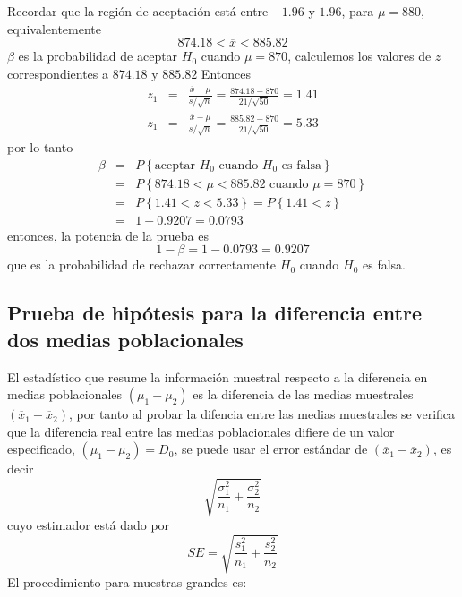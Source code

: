 \begin{Ejem}
Recordar que la regi\'on de aceptaci\'on est\'a entre $-1.96$ y $1.96$, para $\mu=880$, equivalentemente $$874.18<\overline{x}<885.82$$
$\beta$ es la probabilidad de aceptar $H_{0}$ cuando $\mu=870$, calculemos los valores de $z$ correspondientes a $874.18$ y $885.82$ \medskip
Entonces
\begin{eqnarray*}
z_{1}&=&\frac{\overline{x}-\mu}{s/\sqrt{n}}=\frac{874.18-870}{21/\sqrt{50}}=1.41\\
z_{1}&=&\frac{\overline{x}-\mu}{s/\sqrt{n}}=\frac{885.82-870}{21/\sqrt{50}}=5.33
\end{eqnarray*}
por lo tanto
\begin{eqnarray*}
\beta&=&P\left\{\textrm{aceptar }H_{0}\textrm{ cuando }H_{0}\textrm{ es falsa}\right\}\\
&=&P\left\{874.18<\mu<885.82\textrm{ cuando }\mu=870\right\}\\
&=&P\left\{1.41<z<5.33\right\}=P\left\{1.41<z\right\}\\
&=&1-0.9207=0.0793
\end{eqnarray*}
entonces, la potencia de la prueba es
$$1-\beta=1-0.0793=0.9207$$ que es la probabilidad de rechazar correctamente $H_{0}$ cuando $H_{0}$ es falsa.
\end{Ejem}

\subsection*{Prueba de hip\'otesis para la diferencia entre dos medias poblacionales}

El estad\'istico que resume la informaci\'on muestral respecto a la diferencia en medias poblacionales $\left(\mu_{1}-\mu_{2}\right)$ es la diferencia de las medias muestrales $\left(\overline{x}_{1}-\overline{x}_{2}\right)$, por tanto al probar la difencia entre las medias muestrales se verifica que la diferencia real entre las medias poblacionales difiere de un valor especificado, $\left(\mu_{1}-\mu_{2}\right)=D_{0}$, se puede usar el error est\'andar de $\left(\overline{x}_{1}-\overline{x}_{2}\right)$, es decir
$$\sqrt{\frac{\sigma^{2}_{1}}{n_{1}}+\frac{\sigma^{2}_{2}}{n_{2}}}$$
cuyo estimador est\'a dado por
$$SE=\sqrt{\frac{s^{2}_{1}}{n_{1}}+\frac{s^{2}_{2}}{n_{2}}}$$
El procedimiento para muestras grandes es:


